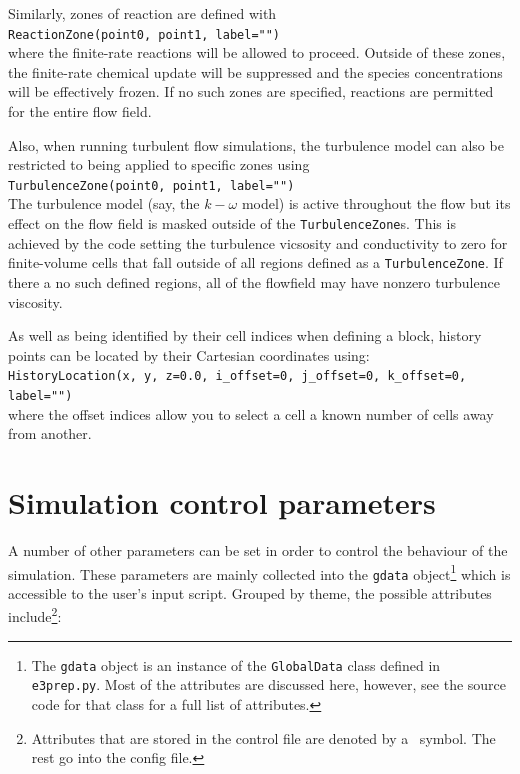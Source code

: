 \documentclass[12pt,a4paper,twoside]{article}
\begin{document}
\medskip
Similarly, zones of reaction are defined with\\
\texttt{ReactionZone(point0, point1, label="")}\\
where the finite-rate reactions will be allowed to proceed.
Outside of these zones, the finite-rate chemical update will be suppressed 
and the species concentrations will be effectively frozen.
If no such zones are specified, reactions are permitted for the entire flow field.

\medskip
Also, when running turbulent flow simulations, the turbulence model can also be
restricted to being applied to specific zones using\\
\texttt{TurbulenceZone(point0, point1, label="")}\\
The turbulence model (say, the $k-\omega$ model) is active throughout the flow
but its effect on the flow field is masked outside of the \texttt{TurbulenceZone}s.
This is achieved by the code setting the turbulence vicsosity and conductivity to zero
for finite-volume cells that fall outside of all regions defined as a \texttt{TurbulenceZone}.
If there a no such defined regions, all of the flowfield may have nonzero turbulence viscosity.

\medskip
As well as being identified by their cell indices when defining a block,
history points can be located by their Cartesian coordinates using:\\
\texttt{HistoryLocation(x, y, z=0.0, i\_offset=0, j\_offset=0, k\_offset=0, label="")} \\
where the offset indices allow you to select a cell a known number of cells 
away from another.

\bigskip
\section{Simulation control parameters}
\label{sec:sim-control-parameters}
%
A number of other parameters can be set in order to control the behaviour of
the simulation.
These parameters are mainly collected into the \texttt{gdata}
object\footnote{The \texttt{gdata} object is an instance of the \texttt{GlobalData}
  class defined in \texttt{e3prep.py}. Most of the attributes are discussed here,
  however, see the source code for that class for a full list of attributes.} 
which is accessible to the user's input script.
Grouped by theme, the possible attributes include\footnote{Attributes that are stored in the control file
are denoted by a \ddag ~symbol.  The rest go into the config file.}:
\end{document}
